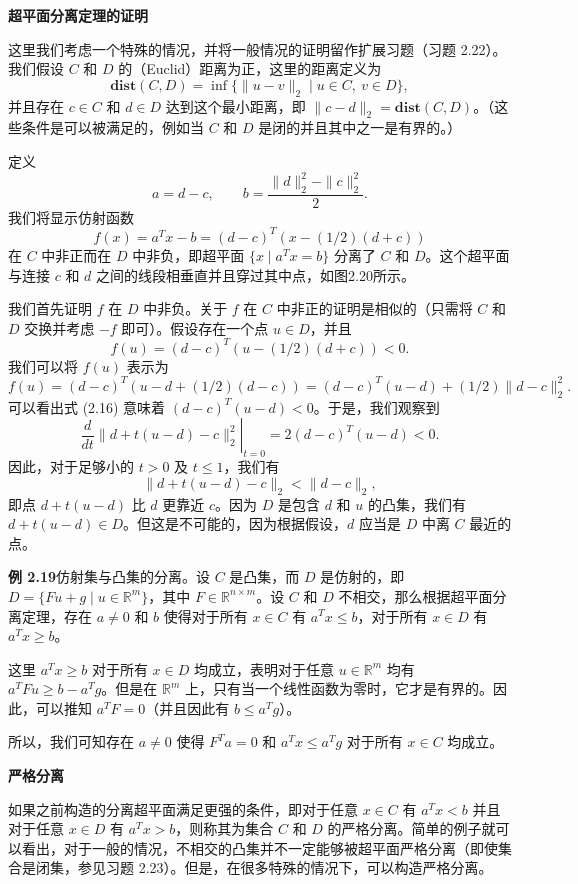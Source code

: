 \documentclass[UTF8,12pt,a4paper,fontset=fandol]{ctexart}
\begin{document}
\noindent\textbf{超平面分离定理的证明}

这里我们考虑一个特殊的情况，并将一般情况的证明留作扩展习题（习题 2.22）。我们假设 $C$ 和 $D$ 的（Euclid）距离为正，这里的距离定义为
\[
  \mathbf{dist}(C,D)=\inf\{\|u-v\|_2\mid u\in C,\ v\in D\},
\]
并且存在 $c\in C$ 和 $d\in D$ 达到这个最小距离，即 $\|c-d\|_2=\mathbf{dist}(C,D)$。（这些条件是可以被满足的，例如当 $C$ 和 $D$ 是闭的并且其中之一是有界的。）

定义
\[
  a=d-c,\qquad b=\frac{\|d\|_2^2-\|c\|_2^2}{2}.
\]
我们将显示仿射函数
\[
  f(x)=a^Tx-b=(d-c)^T(x-(1/2)(d+c))
\]
在 $C$ 中非正而在 $D$ 中非负，即超平面 $\{x\mid a^Tx=b\}$ 分离了 $C$ 和 $D$。这个超平面与连接 $c$ 和 $d$ 之间的线段相垂直并且穿过其中点，如图2.20所示。

我们首先证明 $f$ 在 $D$ 中非负。关于 $f$ 在 $C$ 中非正的证明是相似的（只需将 $C$ 和 $D$ 交换并考虑 $-f$ 即可）。假设存在一个点 $u\in D$，并且
\begin{equation}
  f(u)=(d-c)^T(u-(1/2)(d+c))<0.
  \tag{2.16}
\end{equation}
我们可以将 $f(u)$ 表示为
\[
  f(u)=(d-c)^T(u-d+(1/2)(d-c))=(d-c)^T(u-d)+(1/2)\|d-c\|_2^2.
\]
可以看出式 (2.16) 意味着 $(d-c)^T(u-d)<0$。于是，我们观察到
\[
  \left.\frac{d}{dt}\|d+t(u-d)-c\|_2^2\right|_{t=0}
  =2(d-c)^T(u-d)<0.
\]
因此，对于足够小的 $t>0$ 及 $t\le 1$，我们有
\[
  \|d+t(u-d)-c\|_2<\|d-c\|_2,
\]
即点 $d+t(u-d)$ 比 $d$ 更靠近 $c$。因为 $D$ 是包含 $d$ 和 $u$ 的凸集，我们有 $d+t(u-d)\in D$。但这是不可能的，因为根据假设，$d$ 应当是 $D$ 中离 $C$ 最近的点。

\noindent\textbf{例 2.19}\quad 仿射集与凸集的分离。设 $C$ 是凸集，而 $D$ 是仿射的，即 $D=\{Fu+g\mid u\in\mathbb{R}^m\}$，其中 $F\in\mathbb{R}^{n\times m}$。设 $C$ 和 $D$ 不相交，那么根据超平面分离定理，存在 $a\ne 0$ 和 $b$ 使得对于所有 $x\in C$ 有 $a^Tx\le b$，对于所有 $x\in D$ 有 $a^Tx\ge b$。

这里 $a^Tx\ge b$ 对于所有 $x\in D$ 均成立，表明对于任意 $u\in\mathbb{R}^m$ 均有 $a^TFu\ge b-a^Tg$。但是在 $\mathbb{R}^m$ 上，只有当一个线性函数为零时，它才是有界的。因此，可以推知 $a^TF=0$（并且因此有 $b\le a^Tg$）。

所以，我们可知存在 $a\ne 0$ 使得 $F^Ta=0$ 和 $a^Tx\le a^Tg$ 对于所有 $x\in C$ 均成立。

\noindent\textbf{严格分离}

如果之前构造的分离超平面满足更强的条件，即对于任意 $x\in C$ 有 $a^Tx<b$ 并且对于任意 $x\in D$ 有 $a^Tx>b$，则称其为集合 $C$ 和 $D$ 的严格分离。简单的例子就可以看出，对于一般的情况，不相交的凸集并不一定能够被超平面严格分离（即使集合是闭集，参见习题 2.23）。但是，在很多特殊的情况下，可以构造严格分离。
\end{document}
